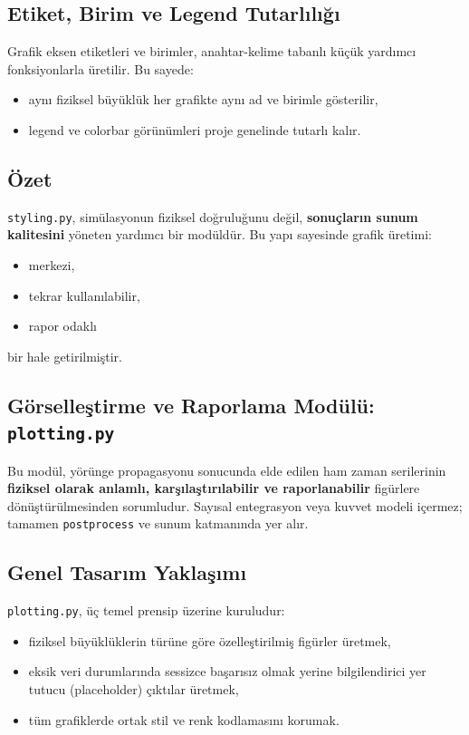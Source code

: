 \subsection*{Etiket, Birim ve Legend Tutarlılığı}
Grafik eksen etiketleri ve birimler,
anahtar-kelime tabanlı küçük yardımcı fonksiyonlarla üretilir.
Bu sayede:
\begin{itemize}
  \item aynı fiziksel büyüklük her grafikte aynı ad ve birimle gösterilir,
  \item legend ve colorbar görünümleri proje genelinde tutarlı kalır.
\end{itemize}

\subsection*{Özet}
\texttt{styling.py}, simülasyonun fiziksel doğruluğunu değil,
\textbf{sonuçların sunum kalitesini} yöneten yardımcı bir modüldür.
Bu yapı sayesinde grafik üretimi:
\begin{itemize}
  \item merkezi,
  \item tekrar kullanılabilir,
  \item rapor odaklı
\end{itemize}
bir hale getirilmiştir.


\newpage
\subsection{Görselleştirme ve Raporlama Modülü: \texttt{plotting.py}}
\label{subsec:plotting}

Bu modül, yörünge propagasyonu sonucunda elde edilen ham zaman serilerinin \textbf{fiziksel olarak anlamlı, karşılaştırılabilir ve raporlanabilir} figürlere dönüştürülmesinden sorumludur.
Sayısal entegrasyon veya kuvvet modeli içermez; tamamen \texttt{postprocess} ve sunum katmanında yer alır.

\subsection*{Genel Tasarım Yaklaşımı}
\texttt{plotting.py}, üç temel prensip üzerine kuruludur:
\begin{itemize}
  \item fiziksel büyüklüklerin türüne göre özelleştirilmiş figürler üretmek,
  \item eksik veri durumlarında sessizce başarısız olmak yerine
        bilgilendirici yer tutucu (placeholder) çıktılar üretmek,
  \item tüm grafiklerde ortak stil ve renk kodlamasını korumak.
\end{itemize}

